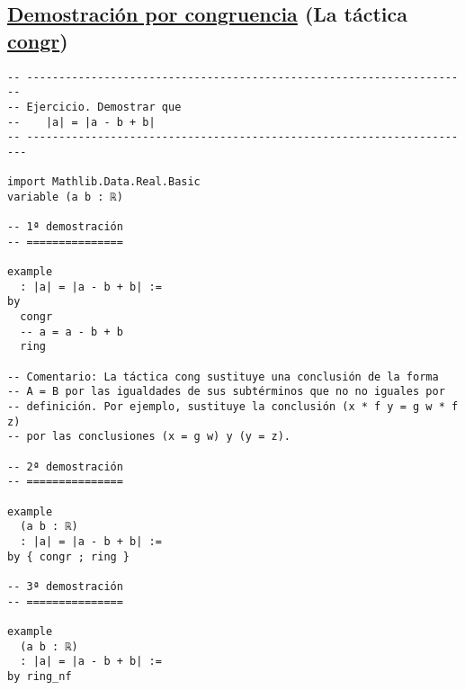 \subsection{\href{./src/Logica/Demostracion\_por\_congruencia.lean}{Demostración por congruencia} (La táctica \href{https://bit.ly/2BfOZqV}{congr})}
\label{sec:org6749917}
\begin{verbatim}
-- ---------------------------------------------------------------------
-- Ejercicio. Demostrar que
--    |a| = |a - b + b|
-- ----------------------------------------------------------------------

import Mathlib.Data.Real.Basic
variable (a b : ℝ)

-- 1ª demostración
-- ===============

example
  : |a| = |a - b + b| :=
by
  congr
  -- a = a - b + b
  ring

-- Comentario: La táctica cong sustituye una conclusión de la forma
-- A = B por las igualdades de sus subtérminos que no no iguales por
-- definición. Por ejemplo, sustituye la conclusión (x * f y = g w * f z)
-- por las conclusiones (x = g w) y (y = z).

-- 2ª demostración
-- ===============

example
  (a b : ℝ)
  : |a| = |a - b + b| :=
by { congr ; ring }

-- 3ª demostración
-- ===============

example
  (a b : ℝ)
  : |a| = |a - b + b| :=
by ring_nf
\end{verbatim}

